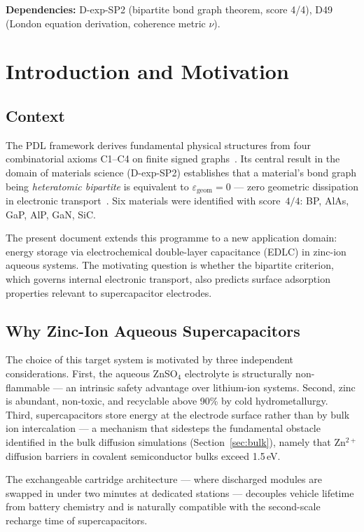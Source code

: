 \documentclass[11pt,a4paper]{article}
\newcommand{\egeom}{\varepsilon_{\mathrm{geom}}}
\begin{document}
\medskip
\noindent\textbf{Dependencies:} D-exp-SP2 (bipartite bond graph theorem, score 4/4), D49 (London equation derivation, coherence metric $\nu$).

\section{Introduction and Motivation}

\subsection{Context}

The PDL framework derives fundamental physical structures from four combinatorial axioms C1--C4 on finite signed graphs~\cite{DM_v20,DS01}. Its central result in the domain of materials science (D-exp-SP2) establishes that a material's bond graph being \emph{heteratomic bipartite} is equivalent to $\egeom = 0$ — zero geometric dissipation in electronic transport~\cite{DexpSP2}. Six materials were identified with score~$4/4$: BP, AlAs, GaP, AlP, GaN, SiC.

The present document extends this programme to a new application domain: energy storage via electrochemical double-layer capacitance (EDLC) in zinc-ion aqueous systems. The motivating question is whether the bipartite criterion, which governs internal electronic transport, also predicts surface adsorption properties relevant to supercapacitor electrodes.

\subsection{Why Zinc-Ion Aqueous Supercapacitors}

The choice of this target system is motivated by three independent considerations. First, the aqueous ZnSO$_4$ electrolyte is structurally non-flammable — an intrinsic safety advantage over lithium-ion systems. Second, zinc is abundant, non-toxic, and recyclable above 90\% by cold hydrometallurgy. Third, supercapacitors store energy at the electrode surface rather than by bulk ion intercalation — a mechanism that sidesteps the fundamental obstacle identified in the bulk diffusion simulations (Section~\ref{sec:bulk}), namely that Zn$^{2+}$ diffusion barriers in covalent semiconductor bulks exceed 1.5\,eV.

The exchangeable cartridge architecture — where discharged modules are swapped in under two minutes at dedicated stations — decouples vehicle lifetime from battery chemistry and is naturally compatible with the second-scale recharge time of supercapacitors.
\end{document}
